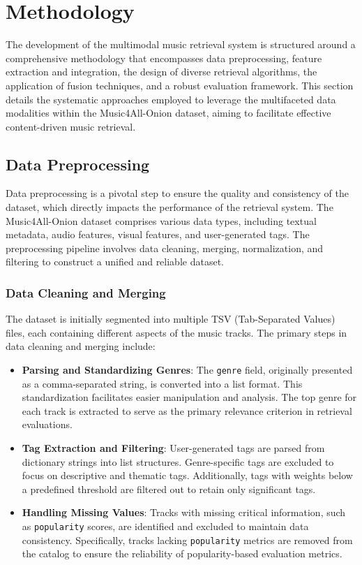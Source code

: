 \documentclass[sigconf]{acmart}
\begin{document}
\section{Methodology}
\label{sec:methodology}

The development of the multimodal music retrieval system is structured around a comprehensive methodology that encompasses data preprocessing, feature extraction and integration, the design of diverse retrieval algorithms, the application of fusion techniques, and a robust evaluation framework. This section details the systematic approaches employed to leverage the multifaceted data modalities within the Music4All-Onion dataset, aiming to facilitate effective content-driven music retrieval.

\subsection{Data Preprocessing}
\label{subsec:data_preprocessing}

Data preprocessing is a pivotal step to ensure the quality and consistency of the dataset, which directly impacts the performance of the retrieval system. The Music4All-Onion dataset comprises various data types, including textual metadata, audio features, visual features, and user-generated tags. The preprocessing pipeline involves data cleaning, merging, normalization, and filtering to construct a unified and reliable dataset.

\subsubsection{Data Cleaning and Merging}

The dataset is initially segmented into multiple TSV (Tab-Separated Values) files, each containing different aspects of the music tracks. The primary steps in data cleaning and merging include:

\begin{itemize}
    \item \textbf{Parsing and Standardizing Genres}: The \texttt{genre} field, originally presented as a comma-separated string, is converted into a list format. This standardization facilitates easier manipulation and analysis. The top genre for each track is extracted to serve as the primary relevance criterion in retrieval evaluations.
    
    \item \textbf{Tag Extraction and Filtering}: User-generated tags are parsed from dictionary strings into list structures. Genre-specific tags are excluded to focus on descriptive and thematic tags. Additionally, tags with weights below a predefined threshold are filtered out to retain only significant tags.
    
    \item \textbf{Handling Missing Values}: Tracks with missing critical information, such as \texttt{popularity} scores, are identified and excluded to maintain data consistency. Specifically, tracks lacking \texttt{popularity} metrics are removed from the catalog to ensure the reliability of popularity-based evaluation metrics.
\end{itemize}
\end{document}
